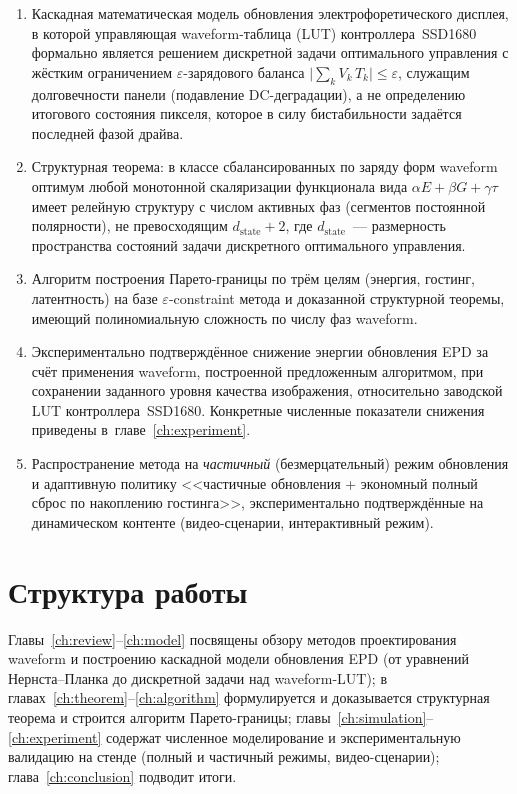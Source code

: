 \begin{enumerate}
    \item Каскадная математическая модель обновления электрофоретического
    дисплея, в которой управляющая waveform-таблица (LUT) контроллера~SSD1680
    формально является решением дискретной задачи оптимального управления с
    жёстким ограничением $\varepsilon$-зарядового баланса
    $\bigl|\sum_k V_k\, T_k\bigr| \le \varepsilon$, служащим долговечности
    панели (подавление DC-деградации), а не определению итогового состояния
    пикселя, которое в силу бистабильности задаётся последней фазой драйва.

    \item Структурная теорема: в классе сбалансированных по заряду форм
    waveform оптимум
    любой монотонной скаляризации функционала вида
    $\alpha E + \beta G + \gamma \tau$ имеет релейную структуру с числом
    активных фаз (сегментов постоянной полярности), не превосходящим
    $d_{\mathrm{state}} + 2$, где $d_{\mathrm{state}}$~--- размерность
    пространства состояний задачи дискретного оптимального управления.

    \item Алгоритм построения Парето-границы по трём целям
    (энергия, гостинг, латентность) на базе $\varepsilon$-constraint
    метода и доказанной структурной теоремы, имеющий полиномиальную сложность
    по числу фаз waveform.

    \item Экспериментально подтверждённое снижение энергии обновления EPD за
    счёт применения waveform, построенной предложенным алгоритмом, при
    сохранении заданного уровня качества изображения, относительно заводской
    LUT контроллера~SSD1680. Конкретные численные показатели снижения
    приведены в~главе~\ref{ch:experiment}.

    \item Распространение метода на \emph{частичный} (безмерцательный) режим
    обновления и адаптивную политику <<частичные обновления + экономный полный
    сброс по накоплению гостинга>>, экспериментально подтверждённые на
    динамическом контенте (видео-сценарии, интерактивный режим).
\end{enumerate}


\section*{Структура работы}

Главы~\ref{ch:review}--\ref{ch:model} посвящены обзору методов проектирования
waveform и построению каскадной модели обновления EPD (от уравнений
Нернста\nobreakdash--Планка до дискретной задачи над waveform-LUT); в
главах~\ref{ch:theorem}--\ref{ch:algorithm} формулируется и доказывается
структурная теорема и строится алгоритм Парето-границы; главы~\ref{ch:simulation}--\ref{ch:experiment}
содержат численное моделирование и экспериментальную валидацию на стенде
(полный и частичный режимы, видео-сценарии); глава~\ref{ch:conclusion} подводит итоги.
